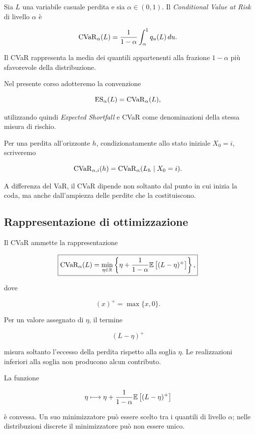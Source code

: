 \label{subsec:cap9-definizione-cvar}

\begin{definition}
Sia $L$ una variabile casuale perdita e sia $\alpha\in(0,1)$. Il
\emph{Conditional Value at Risk} di livello $\alpha$ \`{e}

\[
\operatorname{CVaR}_{\alpha}(L)
=
\frac{1}{1-\alpha}
\int_{\alpha}^{1}
q_u(L)\,du.
\]
\end{definition}

Il CVaR rappresenta la media dei quantili appartenenti alla frazione
$1-\alpha$ pi\`{u} sfavorevole della distribuzione.

Nel presente corso adotteremo la convenzione

\[
\mathrm{ES}_{\alpha}(L)
=
\operatorname{CVaR}_{\alpha}(L),
\]

utilizzando quindi \emph{Expected Shortfall} e CVaR come denominazioni
della stessa misura di rischio.

Per una perdita all'orizzonte $h$, condizionatamente allo stato
iniziale $X_0=i$, scriveremo

\[
\operatorname{CVaR}_{\alpha,i}(h)
=
\operatorname{CVaR}_{\alpha}(L_h\mid X_0=i).
\]

A differenza del VaR, il CVaR dipende non soltanto dal punto in cui
inizia la coda, ma anche dall'ampiezza delle perdite che la
costituiscono.

\subsection{Rappresentazione di ottimizzazione}

\label{subsec:cap9-rappresentazione-ottimizzazione-cvar}

Il CVaR ammette la rappresentazione

\[
\boxed{
\operatorname{CVaR}_{\alpha}(L)
=
\min_{\eta\in\mathbb{R}}
\left\{
\eta
+
\frac{1}{1-\alpha}
\mathbb{E}\left[(L-\eta)^+\right]
\right\},
}
\]

dove

\[
(x)^+
=
\max\{x,0\}.
\]

Per un valore assegnato di $\eta$, il termine

\[
(L-\eta)^+
\]

misura soltanto l'eccesso della perdita rispetto alla soglia $\eta$.
Le realizzazioni inferiori alla soglia non producono alcun contributo.

La funzione

\[
\eta
\longmapsto
\eta
+
\frac{1}{1-\alpha}
\mathbb{E}\left[(L-\eta)^+\right]
\]

\`{e} convessa. Un suo minimizzatore pu\`{o} essere scelto tra i
quantili di livello $\alpha$; nelle distribuzioni discrete il
minimizzatore pu\`{o} non essere unico.

